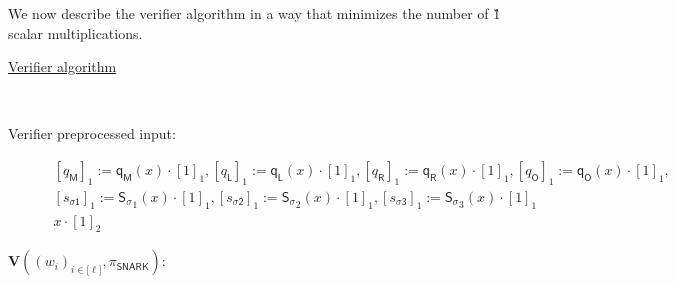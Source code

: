 \documentclass[11pt]{article} %
\newcommand{\ver}{\ensuremath{\mathsf{\mathbf{V}}}\xspace}
\newcommand{\sigpoly}{\ensuremath{\mathsf{S_{\sigma}}}\xspace}
\newcommand{\selmultpoly}{\ensuremath{\mathsf{q_M}}\xspace}
\newcommand{\selleftpoly}{\ensuremath{\mathsf{q_L}}\xspace}
\newcommand{\selrightpoly}{\ensuremath{\mathsf{q_R}}\xspace}
\newcommand{\seloutpoly}{\ensuremath{\mathsf{q_O}}\xspace}
\newcommand{\sigcomma}{\ensuremath{[s_{\mathsf{\sigma1}}]_1}\xspace}
\newcommand{\sigcommb}{\ensuremath{[s_{\mathsf{\sigma2}}]_1}\xspace}
\newcommand{\sigcommc}{\ensuremath{[s_{\mathsf{\sigma3}}]_1}\xspace}
\newcommand{\selleftcomm}{\ensuremath{[q_\mathsf{L}]_1}\xspace}
\newcommand{\selrightcomm}{\ensuremath{[q_\mathsf{R}]_1}\xspace}
\newcommand{\seloutcomm}{\ensuremath{[q_\mathsf{O}]_1}\xspace}
\newcommand{\selmultcomm}{\ensuremath{[q_\mathsf{M}]_1}\xspace}
\newcommand{\snark}{\ensuremath{\mathsf{snark(\lambda)}}\xspace}
\newcommand{\Verify}{\mathcal{V}}
\newcommand{\Vsnark}{\ver}%
\begin{document}
	We now describe the verifier algorithm in a way that minimizes the number of \G1 scalar multiplications.
	\begin{description}
	\item[\underline{Verifier algorithm}] \ \\
	\item[Verifier preprocessed input:] 
	$$
	\begin{array}{l}
 \selmultcomm := \selmultpoly(x) \cdot [1]_1, \selleftcomm := \selleftpoly(x) \cdot [1]_1, \selrightcomm := \selrightpoly(x) \cdot [1]_1, \seloutcomm := \seloutpoly(x) \cdot [1]_1, \\
	\sigcomma := \sigpoly_1(x) \cdot [1]_1, \sigcommb := \sigpoly_2(x) \cdot [1]_1, \sigcommc := \sigpoly_3 (x)\cdot [1]_1 \\
	x \cdot [1]_2
	\end{array}
	$$
	\item[$\Vsnark((w_i)_{i \in {[}\ell{]}}, \pi_{\mathsf{SNARK}})$:] \ \\
\end{description}
\noindent
\end{document}
